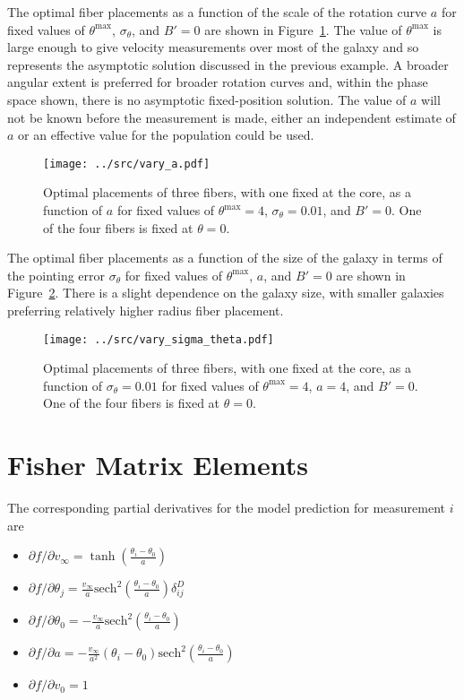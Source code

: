 \documentclass[11pt, oneside]{article}   	%
\begin{document}
The optimal fiber placements as a function of the scale of the rotation curve
$a$ for fixed values of $\theta^\text{max}$, $\sigma_\theta$,
and $B'=0$ are shown in Figure~\ref{fig:a}. 
The value of $\theta^\text{max}$ is large enough to give velocity measurements over most of the galaxy and so represents the asymptotic solution discussed in the previous example.
A broader angular extent is preferred for broader rotation curves and, within the phase space shown, there is no asymptotic fixed-position 
solution.
The value of $a$ will not be known before the measurement is made, either an independent estimate of $a$ or
an effective value for the population could be used.

\begin{figure}[htbp] %
   \centering
   \texttt{[image: ../src/vary\_a.pdf]} 
   \caption{Optimal placements of three fibers, with one fixed at the core, as a function of $a$ for fixed values of $\theta^\text{max}=4$, $\sigma_\theta=0.01$,
and $B'=0$. One of the four fibers is fixed at $\theta=0$.}
   \label{fig:a}
\end{figure}

The optimal fiber placements as a function of the size of the galaxy in terms of the pointing error
$\sigma_\theta$  for fixed values of $\theta^\text{max}$, $a$,
and $B'=0$ are shown in Figure~\ref{fig:sigma_theta}. 
There is a slight dependence on the galaxy size, with smaller galaxies preferring relatively higher radius fiber placement.
 
\begin{figure}[htbp] %
   \centering
   \texttt{[image: ../src/vary\_sigma\_theta.pdf]} 
   \caption{Optimal placements of three fibers, with one fixed at the core, as a function of $\sigma_\theta=0.01$ for fixed values of  $\theta^\text{max}=4$,  $a=4$,
and $B'=0$. One of the four fibers is fixed at $\theta=0$.}
   \label{fig:sigma_theta}
\end{figure}

\appendix
\section{Fisher Matrix Elements}
\label{sec:fisher}
The corresponding partial derivatives for the model prediction for measurement $i$ are
\begin{itemize}
\item $\partial f/ \partial v_\infty =  \tanh{\left(\frac{\theta_i - \theta_0}{a}\right)}$
\item $\partial f/ \partial\theta_j = \frac{v_\infty }{a} \text{sech}^2{\left(\frac{\theta_i - \theta_0}{a}\right)} \delta^D_{ij}$ 
\item $\partial f/ \partial\theta_0 = -\frac{v_\infty }{a} \text{sech}^2{\left(\frac{\theta_i - \theta_0}{a}\right)}$ 
\item $\partial f/ \partial a =-\frac{v_\infty }{a^2} (\theta_i - \theta_0)\text{sech}^2{\left(\frac{\theta_i - \theta_0}{a}\right)}$
\item $\partial f/ \partial v_0 =1$
\end{itemize}
\end{document}
